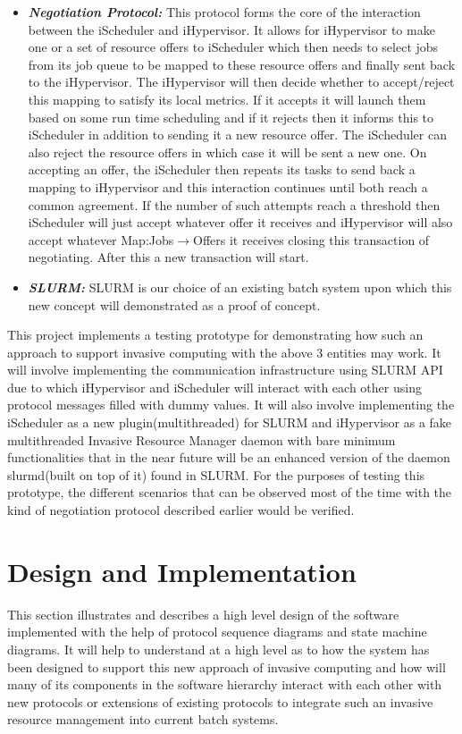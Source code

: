\documentclass[a4paper, 12pt]{article}
\begin{document}
\begin{itemize}
\item \textbf{\textit{Negotiation Protocol:}} This protocol forms the core of the interaction between the iScheduler and iHypervisor. It allows for iHypervisor to make one or a set of resource offers to iScheduler which then needs to select jobs from its job queue to be mapped to these resource offers and finally sent back to the iHypervisor. The iHypervisor will then decide whether to accept/reject this mapping to satisfy its local metrics. If it accepts it will launch them based on some run time scheduling and if it rejects then it informs this to iScheduler in addition to sending it a new resource offer. The iScheduler can also reject the resource offers in which case it will be sent a new one. On accepting an offer, the iScheduler then repeats its tasks to send back a mapping to iHypervisor and this interaction continues until both reach a common agreement. If the number of such attempts reach a threshold then iScheduler will just accept whatever offer it receives and iHypervisor will also accept whatever Map:Jobs$\rightarrow$Offers it receives closing this transaction of negotiating. After this a new transaction will start.
\item \textbf{\textit{SLURM:}} SLURM is our choice of an existing batch system upon which this new concept will demonstrated as a proof of concept.
\end{itemize}
\noindent
This project implements a testing prototype for demonstrating how such an approach to support invasive computing with the above 3 entities may work. It will involve implementing the communication infrastructure using SLURM API due to which iHypervisor and iScheduler will interact with each other using protocol messages filled with dummy values. It will also involve implementing the iScheduler as a new plugin(multithreaded) for SLURM and iHypervisor as a fake multithreaded Invasive Resource Manager daemon with bare minimum functionalities that in the near future will be an enhanced version of the daemon slurmd(built on top of it) found in SLURM. For the purposes of testing this prototype, the different scenarios that can be observed most of the time with the kind of negotiation protocol described earlier would be verified.
\clearpage
\section{Design and Implementation}
This section illustrates and describes a high level design of the software implemented with the help of protocol sequence diagrams and state machine diagrams. It will help to understand at a high level as to how the system has been designed to support this new approach of invasive computing and how will many of its components in the software hierarchy interact with each other with new protocols or extensions of existing protocols to integrate such an invasive resource management into current batch systems.
\end{document}
